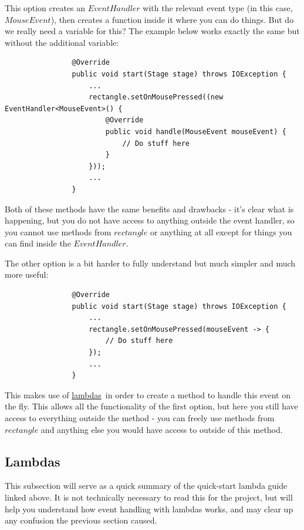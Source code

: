 \documentclass[a4paper]{report}
\newcommand{\link}[2]{\color{blue}\href{#1}{#2}\color{black}}
\begin{document}
			This option creates an $EventHandler$ with the relevant event type (in this case, $MouseEvent$), then creates a function inside it where you can do things. But do we really need a variable for this? The example below works exactly the same but without the additional variable:
			
			\pagebreak
			
			\begin{lstlisting}
				@Override
				public void start(Stage stage) throws IOException {
					...
					rectangle.setOnMousePressed((new EventHandler<MouseEvent>() {
						@Override
						public void handle(MouseEvent mouseEvent) {
							// Do stuff here
						}
					}));
					...
				}
			\end{lstlisting}
			
			Both of these methods have the same benefits and drawbacks - it's clear what is happening, but you do not have access to anything outside the event handler, so you cannot use methods from $rectangle$ or anything at all except for things you can find inside the $EventHandler$.
			
			The other option is a bit harder to fully understand but much simpler and much more useful:
			
			\label{example:event binding with lambda}
			\begin{lstlisting}
				@Override
				public void start(Stage stage) throws IOException {
					...
					rectangle.setOnMousePressed(mouseEvent -> {
						// Do stuff here
					});
					...
				}
			\end{lstlisting}
			
			This makes use of \link{https://www.oracle.com/webfolder/technetwork/tutorials/obe/java/Lambda-QuickStart/index.html}{lambdas}\  in order to create a method to handle this event on the fly. This allows all the functionality of the first option, but here you still have access to everything outside the method - you can freely use methods from $rectangle$ and anything else you would have access to outside of this method.
			
			\subsection{Lambdas}\label{subsec:lambdas}
			
				This subsection will serve as a quick summary of the quick-start lambda guide linked above. It is not technically necessary to read this for the project, but will help you understand how event handling with lambdas works, and may clear up any confusion the previous section caused.
			
\end{document}
